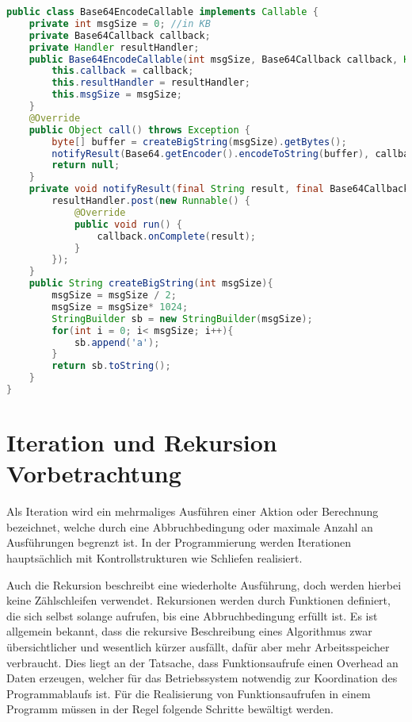 \begin{lstlisting}[language=java,caption={Base64-Callable aus derEnergyEfficience App},label=lst:Base64Callable]
public class Base64EncodeCallable implements Callable {
    private int msgSize = 0; //in KB
    private Base64Callback callback;
    private Handler resultHandler;
    public Base64EncodeCallable(int msgSize, Base64Callback callback, Handler resultHandler){
        this.callback = callback;
        this.resultHandler = resultHandler;
        this.msgSize = msgSize;
    }
    @Override
    public Object call() throws Exception {
        byte[] buffer = createBigString(msgSize).getBytes();
        notifyResult(Base64.getEncoder().encodeToString(buffer), callback, resultHandler);
        return null;
    }
    private void notifyResult(final String result, final Base64Callback callback, final Handler resultHandler){
        resultHandler.post(new Runnable() {
            @Override
            public void run() {
                callback.onComplete(result);
            }
        });
    }
    public String createBigString(int msgSize){
        msgSize = msgSize / 2;
        msgSize = msgSize* 1024;
        StringBuilder sb = new StringBuilder(msgSize);
        for(int i = 0; i< msgSize; i++){
            sb.append('a');
        }
        return sb.toString();
    }
}
\end{lstlisting}

\section{Iteration und Rekursion Vorbetrachtung}

Als Iteration wird ein mehrmaliges Ausführen einer Aktion oder Berechnung bezeichnet, welche durch eine Abbruchbedingung oder maximale Anzahl an Ausführungen begrenzt ist. In der Programmierung werden Iterationen hauptsächlich mit Kontrollstrukturen wie Schliefen realisiert.

Auch die Rekursion beschreibt eine wiederholte Ausführung, doch werden hierbei keine Zählschleifen verwendet. Rekursionen werden durch Funktionen definiert, die sich selbst solange aufrufen, bis eine Abbruchbedingung erfüllt ist. Es ist allgemein bekannt, dass die rekursive Beschreibung eines Algorithmus zwar übersichtlicher und wesentlich kürzer ausfällt, dafür aber mehr Arbeitsspeicher verbraucht. Dies liegt an der Tatsache, dass Funktionsaufrufe einen Overhead an Daten  erzeugen, welcher für das Betriebssystem notwendig zur Koordination des Programmablaufs ist. Für die Realisierung von Funktionsaufrufen in einem Programm müssen in der Regel folgende Schritte bewältigt werden.

